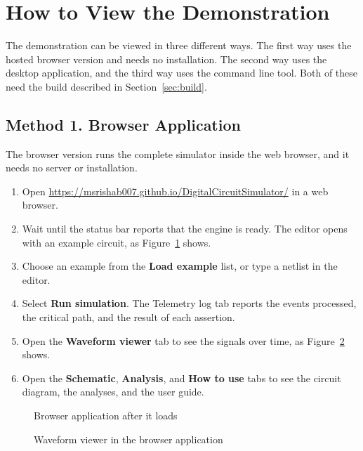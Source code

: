\section{How to View the Demonstration}
\label{sec:demo}

The demonstration can be viewed in three different ways.
The first way uses the hosted browser version and needs no installation.
The second way uses the desktop application, and the third way uses the command line tool.
Both of these need the build described in Section~\ref{sec:build}.

\subsection{Method 1. Browser Application}
\label{sec:browser}

The browser version runs the complete simulator inside the web browser, and it needs no server or installation.

\begin{enumerate}
\item Open \url{https://msrishab007.github.io/DigitalCircuitSimulator/} in a web browser.
\item Wait until the status bar reports that the engine is ready. The editor opens with an example circuit, as Figure~\ref{fig:browserhome} shows.
\item Choose an example from the \textbf{Load example} list, or type a netlist in the editor.
\item Select \textbf{Run simulation}. The Telemetry log tab reports the events processed, the critical path, and the result of each assertion.
\item Open the \textbf{Waveform viewer} tab to see the signals over time, as Figure~\ref{fig:browserwave} shows.
\item Open the \textbf{Schematic}, \textbf{Analysis}, and \textbf{How to use} tabs to see the circuit diagram, the analyses, and the user guide.
\end{enumerate}

\begin{figure}[H]
\centering
{}
\caption{Browser application after it loads}
\label{fig:browserhome}
\end{figure}

\begin{figure}[H]
\centering
{}
\caption{Waveform viewer in the browser application}
\label{fig:browserwave}
\end{figure}

